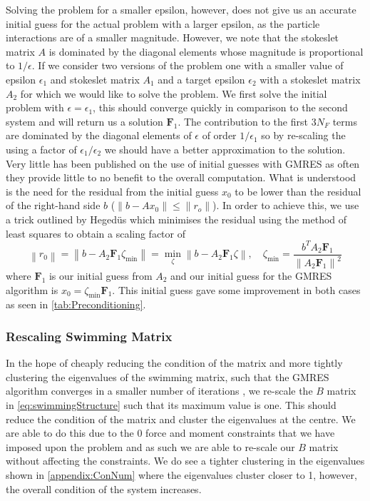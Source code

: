 Solving the problem for a smaller epsilon, however, does not give us an accurate initial guess for the actual problem with a larger epsilon, as the particle interactions are of a smaller magnitude. However, we note that the stokeslet matrix $A$ is dominated by the diagonal elements whose magnitude is proportional to $1/\epsilon$. If we consider two versions of the problem one with a smaller value of epsilon $\epsilon_1$ and stokeslet matrix $A_1$ and a target epsilon $\epsilon_2$ with a stokeslet matrix $A_2$ for which we would like to solve the problem. We first solve the initial problem with $\epsilon=\epsilon_1$, this should converge quickly in comparison to the second system and will return us a solution $\bm{F}_1$. The contribution to the first $3N_{F}$ terms are dominated by the diagonal elements of $\epsilon$ of order $1/\epsilon_1$ so by re-scaling the using a factor of $\epsilon_1/\epsilon_2$ we should have a better approximation to the solution. Very little has been published on the use of initial guesses with GMRES as often they provide little to no benefit to the overall computation. What is understood is the need for the residual from the initial guess $x_0$ to be lower than the residual of the right-hand side $b$ ($\lVert b-Ax_0 \rVert \leq \lVert r_o \rVert$). In order to achieve this, we use a trick outlined by Heged{\"u}s \cite{Saad1986GMRES:Systems,Strakos2005OnComputations} which minimises the residual using the method of least squares to obtain a scaling factor of 
\begin{equation*}
    \left\|r_{0}\right\|=\left\|b-A_2 \bm{F}_1 \zeta_{\min }\right\|=\min _{\zeta}\left\|b-A_2 \bm{F}_1 \zeta\right\|, \quad \zeta_{\min }=\frac{b^{T} A_2 \bm{F}_1}{\left\|A_2 \bm{F}_1\right\|^{2}}
    \label{eq:Hegedus}
\end{equation*}
where $\bm{F}_1$ is our initial guess from $A_2$ and our initial guess for the GMRES algorithm is $x_0 = \zeta_{\min} \bm{F}_1$. This initial guess gave some improvement in both cases as seen in \cref{tab:Preconditioning}.

\subsubsection{Rescaling Swimming Matrix} \label{sec:Rescale}
In the hope of cheaply reducing the condition of the matrix and more tightly clustering the eigenvalues of the swimming matrix, such that the GMRES algorithm converges in a smaller number of iterations \cite{CampbellGMRES}, we re-scale the $B$ matrix in \cref{eq:swimmingStructure} such that its maximum value is one. This should reduce the condition of the matrix and cluster the eigenvalues at the centre. We are able to do this due to the $0$ force and moment constraints that we have imposed upon the problem and as such we are able to re-scale our $B$ matrix without affecting the constraints. 
We do see a tighter clustering in the eigenvalues shown in \cref{appendix:ConNum} where the eigenvalues cluster closer to 1, however, the overall condition of the system increases.


